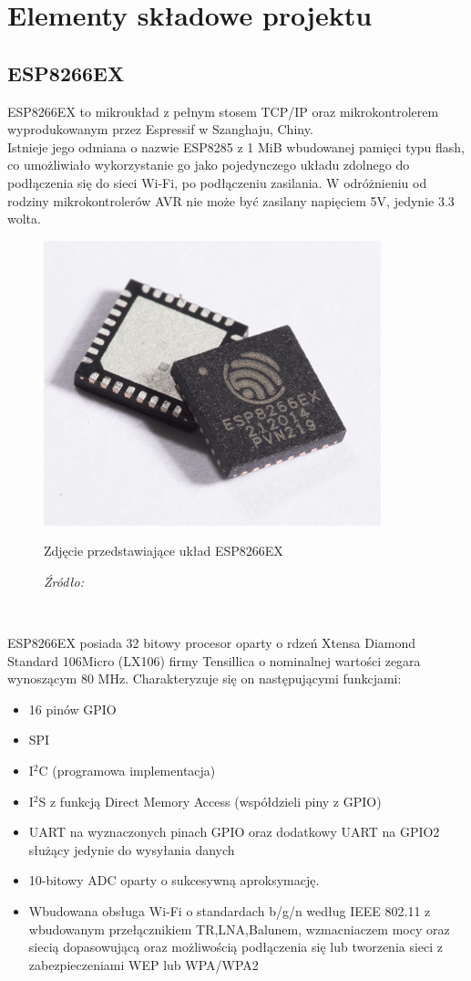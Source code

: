\documentclass[12pt,a4paper,oneside]{memoir}
\begin{document}
\chapter{Elementy składowe projektu} 
\section{ESP8266EX}
\par ESP8266EX to mikroukład z pełnym stosem TCP/IP oraz mikrokontrolerem wyprodukowanym przez Espressif w Szanghaju, Chiny.\\
Istnieje jego odmiana o nazwie ESP8285 z 1 MiB wbudowanej pamięci typu flash, co umożliwiało wykorzystanie go jako pojedynczego układu zdolnego do podłączenia się do sieci Wi-Fi, po podłączeniu zasilania. W odróżnieniu od rodziny mikrokontrolerów AVR nie może być zasilany napięciem 5V, jedynie 3.3 wolta.\\
\begin{figure}[h]
	\centering
	\includegraphics[scale=0.5]{images/esp8266ex.jpg}
	{\tytulyrozdzialow \footnotesize \caption[ESP8266EX]{Zdjęcie przedstawiające układ ESP8266EX}
	\caption*{\textit{Źródło: \cite{esp8266chip}}}}
\end{figure}\\
\par ESP8266EX \cite{esp8266wiki} posiada 32 bitowy procesor oparty o rdzeń Xtensa Diamond Standard 106Micro (LX106) firmy Tensillica o nominalnej wartości zegara wynoszącym 80 MHz. Charakteryzuje się on następującymi funkcjami:
\begin{itemize}
	\item 16 pinów GPIO
	\item SPI
	\item I$^2$C (programowa implementacja)
	\item I$^2$S z funkcją Direct Memory Access (współdzieli piny z GPIO)
	\item UART na wyznaczonych pinach GPIO oraz dodatkowy UART na GPIO2 służący jedynie do wysyłania danych
	\item 10-bitowy ADC oparty o sukcesywną aproksymację.
	\item Wbudowana obsługa Wi-Fi o standardach b/g/n według IEEE 802.11 z wbudowanym przełącznikiem TR,LNA,Balunem, wzmacniaczem mocy oraz siecią dopasowującą oraz możliwością podłączenia się lub tworzenia sieci z zabezpieczeniami WEP lub WPA/WPA2
\end{itemize}
\end{document}
